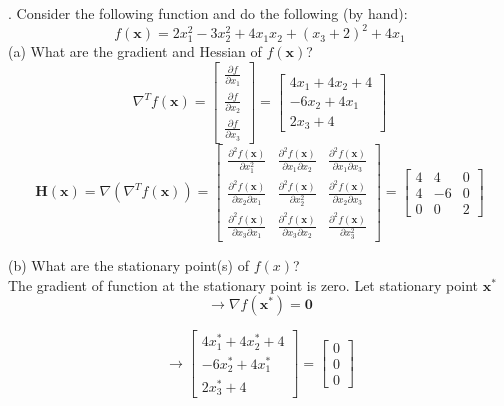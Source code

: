 \documentclass{article} %
\begin{document}
{
    . Consider the following function and do the following (by hand):
    \[ f(\mathbf{x}) = 2x_1^2 - 3x_2^2 + 4x_1x_2 + (x_3 + 2)^2 + 4x_1 \] 
    \noindent (a) What are the gradient and Hessian of $ f(\mathbf{x}) $?
    \[ \nabla^T f(\mathbf{x}) = \begin{bmatrix} \frac{\partial f}{\partial x_1} \\
        \frac{\partial f}{\partial x_2} \\ \frac{\partial f}{\partial x_3} \end{bmatrix} 
        = \begin{bmatrix} 4x_1 + 4x_2 + 4 \\ -6x_2 + 4x_1 \\ 2x_3 + 4 \end{bmatrix} \]
    \[ \mathbf{H}(\mathbf{x}) = \nabla(\nabla^T f(\mathbf{x})) = \begin{bmatrix}
        \frac{\partial^2 f(\mathbf{x})}{\partial x_1^2} & \frac{\partial^2 f(\mathbf{x})}{\partial x_1 \partial x_2} & \frac{\partial^2 f(\mathbf{x})}{\partial x_1 \partial x_3} \\
        \frac{\partial^2 f(\mathbf{x})}{\partial x_2 \partial x_1} & \frac{\partial^2 f(\mathbf{x})}{\partial x_2^2} & \frac{\partial^2 f(\mathbf{x})}{\partial x_2 \partial x_3} \\
        \frac{\partial^2 f(\mathbf{x})}{\partial x_3 \partial x_1} & \frac{\partial^2 f(\mathbf{x})}{\partial x_3 \partial x_2} & \frac{\partial^2 f(\mathbf{x})}{\partial x_3^2}
    \end{bmatrix}
    = \begin{bmatrix}
        4 & 4 & 0 \\
        4 & -6 & 0 \\
        0 & 0 & 2
    \end{bmatrix} \]

    \noindent (b) What are the stationary point(s) of $ f(x) $? \\

    The gradient of function at the stationary point is zero. Let stationary point $\mathbf{x^*}$
    \[ \rightarrow \nabla f(\mathbf{x^*}) = \mathbf{0} \]

    \[ \rightarrow \begin{bmatrix} 4x^*_1 + 4x^*_2 + 4 \\ -6x^*_2 + 4x^*_1 \\ 2x^*_3 + 4 \end{bmatrix} = \begin{bmatrix} 0 \\ 0 \\ 0 \end{bmatrix} \]
    
}
\end{document}

